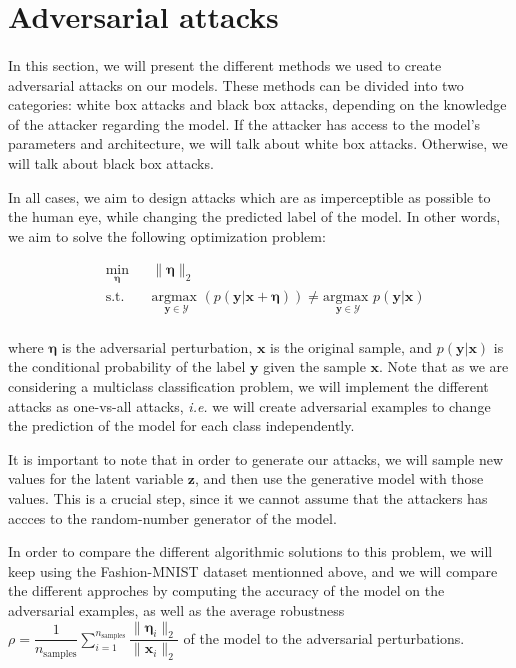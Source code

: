 \documentclass[11pt,twocolumn,letterpaper]{article}
\begin{document}
\section{Adversarial attacks}
\label{sec:attacks}

\paragraph{} In this section, we will present the different methods we used to create adversarial attacks on our models. These methods can be divided into two categories: white box attacks and black box attacks, depending on the knowledge of the attacker regarding the model. If the attacker has access to the model's parameters and architecture, we will talk about white box attacks. Otherwise, we will talk about black box attacks. 

In all cases, we aim to design attacks which are as imperceptible as possible to the human eye, while changing the predicted label of the model. In other words, we aim to solve the following optimization problem:

\begin{equation*}
\tag{Adversarial Attack Problem}
\begin{aligned}
& \underset{\bm{\eta}}{\text{min}} 
& & \|\bm{\eta}\|_2 \\
& \text{s.t.} 
& & \underset{\bm{y} \in \mathcal{Y}}{\text{argmax }}(p(\bm{y}|\bm{x} + \bm{\eta})) \neq \underset{\bm{y} \in \mathcal{Y}}{\text{argmax }}p(\bm{y}|\bm{x}) \\
\end{aligned}
\label{pb:gen}
\end{equation*}

where $\bm{\eta}$ is the adversarial perturbation, $\bm{x}$ is the original sample, and $p(\bm{y}|\bm{x})$ is the conditional probability of the label $\bm{y}$ given the sample $\bm{x}$. Note that as we are considering a multiclass classification problem, we will implement the different attacks as one-vs-all attacks, \textit{i.e.} we will create adversarial examples to change the prediction of the model for each class independently.

It is important to note that in order to generate our attacks, we will sample new values for the latent variable $\bm{z}$, and then use the generative model with those values. This is a crucial step, since it we cannot assume that the attackers has accces to the random-number generator of the model.

In order to compare the different algorithmic solutions to this problem, we will keep using the Fashion-MNIST dataset mentionned above, and we will compare the different approches by computing the accuracy of the model on the adversarial examples, as well as the average robustness $\rho = \displaystyle \dfrac{1}{n_{\text{samples}}} \sum \limits_{i=1}^{n_{\text{samples}}} \dfrac{\|\bm{\eta}_i \|_2}{\|\bm{x}_i\|_2}$ of the model to the adversarial perturbations.
\end{document}
